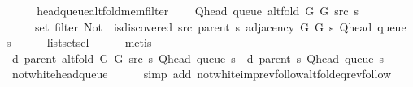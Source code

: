 \begin{isabellebody}
\ \ \isamarkupfalse%
\ \isamarkupfalse%
\ head{\isacharunderscore}{\kern0pt}queue{\isacharunderscore}{\kern0pt}alt{\isacharunderscore}{\kern0pt}fold{\isacharunderscore}{\kern0pt}mem{\isacharunderscore}{\kern0pt}filter{\isacharcolon}{\kern0pt}\isanewline
\ \ \ \ {\isachardoublequoteopen}Q{\isacharunderscore}{\kern0pt}head\ {\isacharparenleft}{\kern0pt}queue\ {\isacharparenleft}{\kern0pt}alt{\isacharunderscore}{\kern0pt}fold\ G{}\ G{}\ src\ s{\isacharparenright}{\kern0pt}{\isacharparenright}{\kern0pt}\ {\isasymin}\isanewline
\ \ \ \ \ set\ {\isacharparenleft}{\kern0pt}filter\ {\isacharparenleft}{\kern0pt}Not\ {\isasymcirc}\ is{\isacharunderscore}{\kern0pt}discovered\ src\ {\isacharparenleft}{\kern0pt}parent\ s{\isacharparenright}{\kern0pt}{\isacharparenright}{\kern0pt}\ {\isacharparenleft}{\kern0pt}adjacency\ G{}\ G{}\ s\ {\isacharparenleft}{\kern0pt}Q{\isacharunderscore}{\kern0pt}head\ {\isacharparenleft}{\kern0pt}queue\ s{\isacharparenright}{\kern0pt}{\isacharparenright}{\kern0pt}{\isacharparenright}{\kern0pt}{\isacharparenright}{\kern0pt}{\isachardoublequoteclose}\isanewline
\ \ \ \ \isamarkupfalse%
\ list{\isachardot}{\kern0pt}set{\isacharunderscore}{\kern0pt}sel{\isacharparenleft}{\kern0pt}{}{\isacharparenright}{\kern0pt}\isanewline
\ \ \ \ \isamarkupfalse%
\ metis\isanewline
\isanewline
\ \ \isamarkupfalse%
\ {\isachardoublequoteopen}d\ {\isacharparenleft}{\kern0pt}parent\ {\isacharparenleft}{\kern0pt}alt{\isacharunderscore}{\kern0pt}fold\ G{}\ G{}\ src\ s{\isacharparenright}{\kern0pt}{\isacharparenright}{\kern0pt}\ {\isacharparenleft}{\kern0pt}Q{\isacharunderscore}{\kern0pt}head\ {\isacharparenleft}{\kern0pt}queue\ s{\isacharparenright}{\kern0pt}{\isacharparenright}{\kern0pt}\ {\isacharequal}{\kern0pt}\ d\ {\isacharparenleft}{\kern0pt}parent\ s{\isacharparenright}{\kern0pt}\ {\isacharparenleft}{\kern0pt}Q{\isacharunderscore}{\kern0pt}head\ {\isacharparenleft}{\kern0pt}queue\ s{\isacharparenright}{\kern0pt}{\isacharparenright}{\kern0pt}{\isachardoublequoteclose}\isanewline
\ \ \ \ \isamarkupfalse%
\ not{\isacharunderscore}{\kern0pt}white{\isacharunderscore}{\kern0pt}head{\isacharunderscore}{\kern0pt}queue\isanewline
\ \ \ \ \isamarkupfalse%
\ {\isacharparenleft}{\kern0pt}simp\ add{\isacharcolon}{\kern0pt}\ not{\isacharunderscore}{\kern0pt}white{\isacharunderscore}{\kern0pt}imp{\isacharunderscore}{\kern0pt}rev{\isacharunderscore}{\kern0pt}follow{\isacharunderscore}{\kern0pt}alt{\isacharunderscore}{\kern0pt}fold{\isacharunderscore}{\kern0pt}eq{\isacharunderscore}{\kern0pt}rev{\isacharunderscore}{\kern0pt}follow{\isacharparenright}{\kern0pt}\isanewline

\end{isabellebody}
